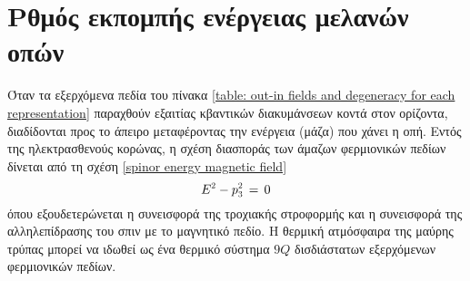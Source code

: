 \section{Ρθμός εκπομπής ενέργειας μελανών οπών}\label{sec:energy radiation of one dimensional fermionic model}
Όταν τα εξερχόμενα πεδία του πίνακα \ref{table: out-in fields and degeneracy for each representation} 
παραχθούν εξαιτίας κβαντικών διακυμάνσεων κοντά στον ορίζοντα, διαδίδονται προς το άπειρο μεταφέροντας την ενέργεια (μάζα) που χάνει η οπή. 
Εντός της ηλεκτρασθενούς κορώνας, η σχέση διασποράς των άμαζων φερμιονικών πεδίων δίνεται από τη σχέση \eqref{spinor energy magnetic field}
\begin{equation}\label{massless spinor energy magnetic field}
    E\superscr{2}-p\subscr{3}\superscr{2}\,=\,0
\end{equation}
όπου εξουδετερώνεται η συνεισφορά της τροχιακής στροφορμής και η συνεισφορά της αλληλεπίδρασης του σπιν με το μαγνητικό πεδίο. %
Η θερμική ατμόσφαιρα της μαύρης τρύπας μπορεί να ιδωθεί ως ένα θερμικό σύστημα $9Q$ δισδιάστατων εξερχόμενων φερμιονικών πεδίων. 

